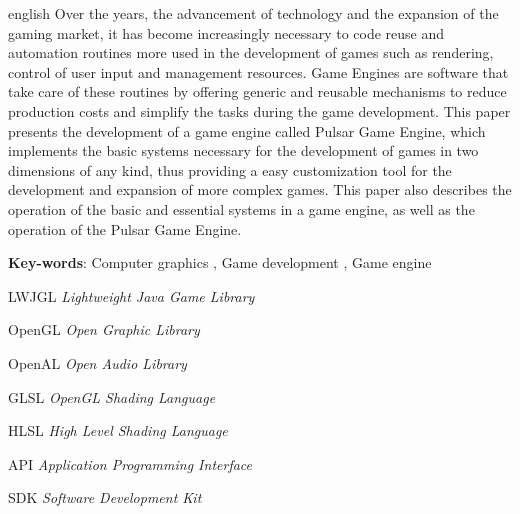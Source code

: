 \documentclass[12pt,	openright, twoside,	a4paper, english, french, spanish, brazil]{abntex2}
\begin{document}
\begin{resumo}[Abstract]
 \begin{otherlanguage*}{english}
Over the years, the advancement of technology and the expansion of the gaming market, it has become increasingly necessary to code reuse and automation routines more used in the development of games such as rendering, control of user input and management resources.
Game Engines are software that take care of these routines by offering generic and reusable mechanisms to reduce production costs and simplify the tasks during the game development. This paper presents the development of a game engine called Pulsar Game Engine, which implements the basic systems necessary for the development of games in two dimensions of any kind, thus providing a easy customization tool for the development and expansion of more complex games. This paper also describes the operation of the basic and essential systems in a game engine, as well as the operation of the Pulsar Game Engine.

   \vspace{\onelineskip}
 
   \noindent 
   \textbf{Key-words}: Computer graphics , Game development , Game engine
 \end{otherlanguage*}
\end{resumo}


\listoffigures*
\cleardoublepage

\begin{siglas}
\item[LWJGL] \textit{Lightweight Java Game Library}
\item[OpenGL] \textit{Open Graphic Library}
\item[OpenAL] \textit{Open Audio Library}
\item[GLSL] \textit{OpenGL Shading Language}
\item[HLSL] \textit{High Level Shading Language}
\item[API] \textit{Application Programming Interface}
\item[SDK] \textit{Software Development Kit}
\end{siglas}

\tableofcontents*
\cleardoublepage



\textual
\end{document}
